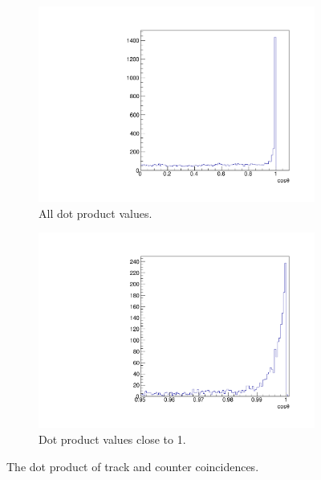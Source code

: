 \begin{figure}[h!]
  \centering
  \begin{subfigure}{0.45\textwidth}
    \centering
    \includegraphics[width=\textwidth]{CosTheta_Data}
    \caption{All dot product values.}
  \end{subfigure}
  \hspace{0.08\textwidth}
  \begin{subfigure}{0.45\textwidth}
    \centering
    \includegraphics[width=\textwidth]{CosThetaZoom_Data}
    \caption{Dot product values close to 1.}
  \end{subfigure}
  \caption[The dot product of track and counter coincidences]
          {The dot product of track and counter coincidences.}
          \label{fig:CounterCoincidence}
\end{figure}

